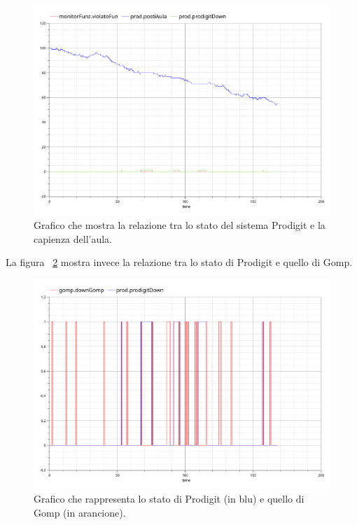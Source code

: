 \begin{figure}[htp]
\begin{center}
  \includegraphics[width=1 \textwidth]{Figure/prodigit down.pdf}
    \caption{Grafico che mostra la relazione tra lo stato del sistema Prodigit e la capienza dell’aula.} \label{figura: prodigit down}
\end{center}
\end{figure}

La figura  ~\ref{figura: prodigit e gomp} mostra invece la relazione tra lo stato di Prodigit e quello di Gomp.\\

\begin{figure}[htp]
\begin{center}
  \includegraphics[width=1 \textwidth]{Figure/prod e gomp down.pdf}
    \caption{Grafico che rappresenta lo stato di Prodigit (in blu) e quello di Gomp (in arancione).}\label{figura: prodigit e gomp} 
\end{center}
\end{figure}

